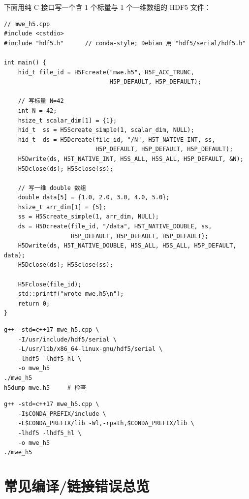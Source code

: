 下面用纯 C 接口写一个含 1 个标量与 1 个一维数组的 HDF5 文件：

\begin{lstlisting}[style=cpp,caption={HDF5 最小工作示例。}]
// mwe_h5.cpp
#include <cstdio>
#include "hdf5.h"      // conda-style; Debian 用 "hdf5/serial/hdf5.h"

int main() {
    hid_t file_id = H5Fcreate("mwe.h5", H5F_ACC_TRUNC,
                              H5P_DEFAULT, H5P_DEFAULT);

    // 写标量 N=42
    int N = 42;
    hsize_t scalar_dim[1] = {1};
    hid_t  ss = H5Screate_simple(1, scalar_dim, NULL);
    hid_t  ds = H5Dcreate(file_id, "/N", H5T_NATIVE_INT, ss,
                          H5P_DEFAULT, H5P_DEFAULT, H5P_DEFAULT);
    H5Dwrite(ds, H5T_NATIVE_INT, H5S_ALL, H5S_ALL, H5P_DEFAULT, &N);
    H5Dclose(ds); H5Sclose(ss);

    // 写一维 double 数组
    double data[5] = {1.0, 2.0, 3.0, 4.0, 5.0};
    hsize_t arr_dim[1] = {5};
    ss = H5Screate_simple(1, arr_dim, NULL);
    ds = H5Dcreate(file_id, "/data", H5T_NATIVE_DOUBLE, ss,
                   H5P_DEFAULT, H5P_DEFAULT, H5P_DEFAULT);
    H5Dwrite(ds, H5T_NATIVE_DOUBLE, H5S_ALL, H5S_ALL, H5P_DEFAULT, data);
    H5Dclose(ds); H5Sclose(ss);

    H5Fclose(file_id);
    std::printf("wrote mwe.h5\n");
    return 0;
}
\end{lstlisting}

\begin{lstlisting}[style=config,caption={编译（系统 hdf5\_serial）。}]
g++ -std=c++17 mwe_h5.cpp \
    -I/usr/include/hdf5/serial \
    -L/usr/lib/x86_64-linux-gnu/hdf5/serial \
    -lhdf5 -lhdf5_hl \
    -o mwe_h5
./mwe_h5
h5dump mwe.h5     # 检查
\end{lstlisting}

\begin{lstlisting}[style=config,caption={编译（conda env）。}]
g++ -std=c++17 mwe_h5.cpp \
    -I$CONDA_PREFIX/include \
    -L$CONDA_PREFIX/lib -Wl,-rpath,$CONDA_PREFIX/lib \
    -lhdf5 -lhdf5_hl \
    -o mwe_h5
./mwe_h5
\end{lstlisting}

\section{常见编译/链接错误总览}
\label{sec:appD:link_errors}

